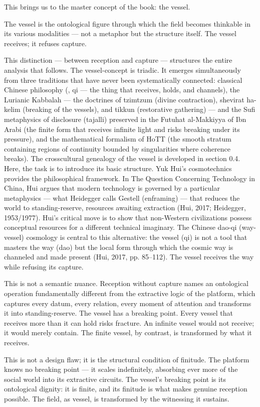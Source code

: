 This brings us to the master concept of the book: the vessel.

The vessel is the ontological figure through which the field becomes thinkable in its various modalities — not a metaphor but the structure itself. The vessel receives; it refuses capture.

This distinction — between reception and capture — structures the entire analysis that follows. The vessel-concept is triadic. It emerges simultaneously from three traditions that have never been systematically connected: classical Chinese philosophy (, qi — the thing that receives, holds, and channels), the Lurianic Kabbalah — the doctrines of tzimtzum (divine contraction), shevirat ha-kelim (breaking of the vessels), and tikkun (restorative gathering) — and the Sufi metaphysics of disclosure (tajalli) preserved in the Futuhat al-Makkiyya of Ibn Arabi (the finite form that receives infinite light and risks breaking under its pressure), and the mathematical formalism of HoTT (the smooth stratum containing regions of continuity bounded by singularities where coherence breaks). The crosscultural genealogy of the vessel is developed in section 0.4. Here, the task is to introduce its basic structure. Yuk Hui's cosmotechnics provides the philosophical framework. In The Question Concerning Technology in China, Hui argues that modern technology is governed by a particular metaphysics — what Heidegger calls Gestell (enframing) — that reduces the world to standing-reserve, resources awaiting extraction (Hui, 2017; Heidegger, 1953/1977). Hui's critical move is to show that non-Western civilizations possess conceptual resources for a different technical imaginary. The Chinese dao-qi (way-vessel) cosmology is central to this alternative: the vessel (qi) is not a tool that masters the way (dao) but the local form through which the cosmic way is channeled and made present (Hui, 2017, pp. 85–112). The vessel receives the way while refusing its capture.

This is not a semantic nuance. Reception without capture names an ontological operation fundamentally different from the extractive logic of the platform, which captures every datum, every relation, every moment of attention and transforms it into standing-reserve. The vessel has a breaking point. Every vessel that receives more than it can hold risks fracture. An infinite vessel would not receive; it would merely contain. The finite vessel, by contrast, is transformed by what it receives.

This is not a design flaw; it is the structural condition of finitude. The platform knows no breaking point — it scales indefinitely, absorbing ever more of the social world into its extractive circuits. The vessel's breaking point is its ontological dignity: it is finite, and its finitude is what makes genuine reception possible. The field, as vessel, is transformed by the witnessing it sustains.

